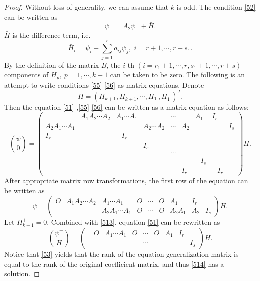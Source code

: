 \documentclass[a4paper,reqno,11pt]{amsart}
\numberwithin{equation}{section} %
\begin{document}
\begin{proof}
Without loss of generality, we can assume that $k$ is odd. 
The condition \ref{52} can be written as
\begin{equation}\label{513}
	\psi^{+}=A_2\psi ^{-}+\bar{H} .
\end{equation}
$\bar{H}$  is the difference term, i.e.
\begin{equation}
    \bar{H}_i =\psi _i- \sum_{j=1}^r{a_{ij}\psi _j,\,\,i=r+1,\cdots ,r+s_1}.
\end{equation}
By the definition of the matrix $B$, 
the $i$-th $(i=r_1+1,\cdots,r,s_1+1,\cdots,r+s)$ components of $H_p,\ p = 1, \cdots , k+1$ can be taken to be zero. 
The following is an attempt to write conditions \eqref{55}-\eqref{56} as matrix equations. Denote
$$
H=\left( H^{-}_{k+1},H^{+}_{k+1},\cdots ,H^{-}_{1},H^{+}_{1} \right) ^T .
$$
Then the equation \eqref{51} ,\eqref{55}-\eqref{56} can be written as a matrix equation as follows:
$$
\binom{\psi}{0} = \left( \begin{matrix}
   & A_1A_2\cdots A_2&		A_1\cdots A_1&	&	\cdots&		&A_1 & I _r&		\\
    A_2A_1\cdots A_1&	&	&A_2\cdots A_2&		\cdots&		A_2&	&	&I_s\\
    I_r& &-I_r &  & & & & & \\
    & & & I_s & & & & &\\
    & & &  & \cdots& & & &\\
    & & &  & & & -I_s& &\\
    & & &  & &I_r & & -I_r& 
\end{matrix} \right) H.
$$
After appropriate matrix row transformations, the first row of the equation can be written as
$$
\psi = \left( \begin{matrix}
  O&  A_1A_2\cdots A_2&		A_1\cdots A_1&O	&	\cdots&	O&	A_1&	I_r&	\\
   & &  A_2A_1\cdots A_1&	O&	\cdots&	O	&	A_2A_1 &	A_2 &	I_s
\end{matrix} \right) H.
$$
Let $H^{+}_{k+1}=0$. Combined with \eqref{513}, equation \eqref{51} can be rewritten as
\begin{equation}\label{514}
	\binom{\psi ^{-}}{\bar{H} } =\left( \begin{matrix}
		&O  &		A_1\cdots A_1&O	&	\cdots&	O&	A_1&	I_r&	\\
		 & &  &	&	\cdots&	&	 & &	I_s
	  \end{matrix} \right) H.
\end{equation}
Notice that \eqref{53}  yields that the rank of the equation generalization matrix is equal to the rank of the original coefficient matrix, and thus \eqref{514} has a solution.
\end{proof}
\end{document}
